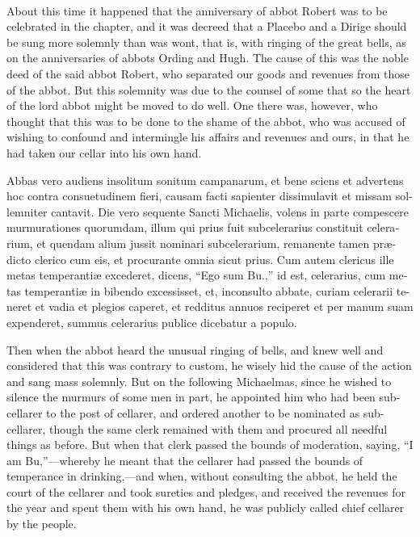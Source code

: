 \documentclass{book}
\newcounter{engnote}
\newcommand{\engnotenum}{\textsuperscript{\arabic{engnote}\stepcounter{engnote}}}
\begin{document}
\begin{paracol}{2}
\switchcolumn

About this time it happened that the anniversary of abbot Robert\engnotenum{} was to be celebrated in the chapter, and it was decreed that a Placebo and a Dirige should be sung more solemnly than was wont, that is, with ringing of the great bells, as on the anniversaries of abbots Ording and Hugh. The cause of this was the noble deed of the said abbot Robert, who separated our goods and revenues from those of the abbot. But this solemnity was due to the counsel of some that so the heart of the lord abbot might be moved to do well. One there was, however, who thought that this was to be done to the shame of the abbot, who was accused of wishing to confound and intermingle his affairs and revenues and ours, in that he had taken our cellar into his own hand.

\switchcolumn*

\begin{otherlanguage}{latin}
Abbas vero audiens insolitum sonitum campanarum, et bene sciens et advertens hoc contra consuetudinem fieri, causam facti sapienter dissimulavit et missam sollemniter cantavit. Die vero sequente Sancti Michaelis, volens in parte compescere murmurationes quorumdam, illum qui prius fuit subcelerarius constituit celerarium, et quendam alium jussit nominari subcelerarium, remanente tamen pr\ae{}dicto clerico cum eis, et procurante omnia sicut prius. Cum autem clericus ille metas temperanti\ae{} excederet, dicens, ``Ego sum Bu.,'' id est, celerarius, cum metas temperanti\ae{} in bibendo excessisset, et, inconsulto abbate, curiam celerarii teneret et vadia et plegios caperet, et redditus annuos reciperet et per manum suam expenderet, summus celerarius publice dicebatur a populo. 
\end{otherlanguage}

\switchcolumn

Then when the abbot heard the unusual ringing of bells, and knew well and considered that this was contrary to custom, he wisely hid the cause of the action and sang mass solemnly. But on the following Michaelmas, since he wished to silence the murmurs of some men in part, he appointed him who had been sub-cellarer to the post of cellarer, and ordered another to be nominated as sub-cellarer, though the same clerk remained with them and procured all needful things as before. But when that clerk passed the bounds of moderation, saying, ``I am Bu,''---whereby he meant that the cellarer had passed the bounds of temperance in drinking,---and when, without consulting the abbot, he held the court of the cellarer and took sureties and pledges, and received the revenues for the year and spent them with his own hand, he was publicly called chief cellarer by the people.


\end{paracol}
\end{document}
